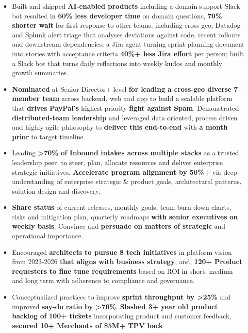 \documentclass[10pt,letterpaper]{article}
\newcommand{\bd}[1]{\textbf{#1}}
\begin{document}
\begin{itemize}
  planning, feature development, and PR review from Jira requirements, built bottom-up from single-purpose agents;
  \bd{30+\% faster requirements-to-review}, lets developers new to our systems contribute, now being tested on system bugs.
\item Built and shipped \bd{AI-enabled products} including a domain-support Slack bot resulted in \bd{60\% less
  developer time} on domain questions, \bd{70\% shorter wait} for first response to other teams, including cross-geo;
  Datadog and Splunk alert triage that analyses deviations against code, recent rollouts and downstream dependencies;
  a Jira agent turning sprint-planning document into stories with acceptance criteria \bd{40\%+ less Jira effort} per person;
  built a Slack bot that turns daily reflections into weekly kudos and monthly growth summaries.
\item \bd{Nominated} at Senior Director+ level \bd{for leading a cross-geo diverse 7+ member team}
  across backend, web and app to build a scalable platform that \bd{drives PayPal's} highest
  priority \bd{fight against Spam}. Demonstrated \bd{distributed-team leadership} and leveraged data oriented, process driven and highly agile
  philosophy to \bd{deliver this end-to-end} with \bd{a month prior} to target timeline.
\item Leading \bd{>70\% of Inbound intakes across multiple stacks} as a trusted leadership peer, to steer, plan,
  allocate resources and deliver enterprise strategic initiatives. \bd{Accelerate program
  alignment by 50\%+} via deep understanding of enterprise strategic \& product goals,
  architectural patterns, solution design and discovery.
\item \bd{Share status} of current releases, monthly goals, team burn down charts, risks
  and mitigation plan, quarterly roadmaps \bd{with senior executives on weekly basis}.
  Convince and \bd{persuade on matters of strategic} and operational importance.
\item Encouraged \bd{architects to pursue 8 tech initiatives} in platform vision from
  2023-2026 \bd{that aligns with business strategy}, and, \bd{120+ Product requesters to
  fine tune requirements} based on ROI in short, medium and long term with adherence to
  compliance and governance.
\item Conceptualized practices to improve \bd{sprint throughput by >25\%} and improved
  \bd{say-do ratio by >70\%}. \bd{Slashed 3+ year old product backlog of 100+ tickets}
  incorporating product and customer feedback, \bd{secured 10+ Merchants of \$5M+ TPV back
}
\end{itemize}
\end{document}
